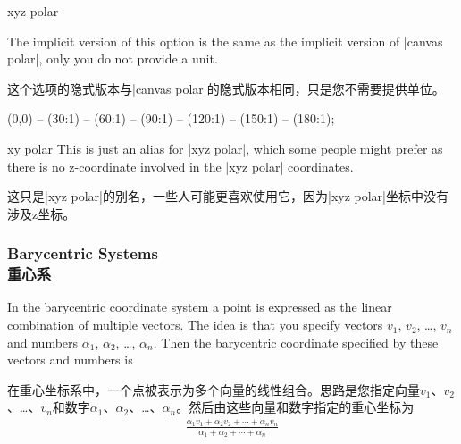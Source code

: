 \begin{coordinatesystem}{xyz polar}
\begin{codeexample}[]
\end{codeexample}

    The implicit version of this option is the same as the implicit version of
    |canvas polar|, only you do not provide a unit.

    这个选项的隐式版本与|canvas polar|的隐式版本相同，只是您不需要提供单位。
\begin{codeexample}[]
\tikz[x={(0cm,1cm)},y={(-1cm,0cm)}]
  \draw  (0,0) -- (30:1) -- (60:1) -- (90:1)
             -- (120:1) -- (150:1) -- (180:1);
\end{codeexample}
\end{coordinatesystem}

\begin{coordinatesystem}{xy polar}
    This is just an alias for |xyz polar|, which some people might prefer as
    there is no z-coordinate involved in the |xyz polar| coordinates.

    这只是|xyz polar|的别名，一些人可能更喜欢使用它，因为|xyz polar|坐标中没有涉及z坐标。
\end{coordinatesystem}


\subsubsection{Barycentric Systems\\重心系}
\label{section-barycentric-coordinates}

In the barycentric coordinate system a point is expressed as the linear
combination of multiple vectors. The idea is that you specify vectors $v_1$,
$v_2$, \dots, $v_n$ and numbers $\alpha_1$, $\alpha_2$, \dots, $\alpha_n$. Then
the barycentric coordinate specified by these vectors and numbers is

在重心坐标系中，一个点被表示为多个向量的线性组合。思路是您指定向量$v_1$、$v_2$、\dots、$v_n$和数字$\alpha_1$、$\alpha_2$、\dots、$\alpha_n$。然后由这些向量和数字指定的重心坐标为
%
\begin{align*}
    \frac{\alpha_1 v_1 + \alpha_2 v_2 + \cdots + \alpha_n v_n}{\alpha_1
        + \alpha_2 + \cdots + \alpha_n}
\end{align*}

